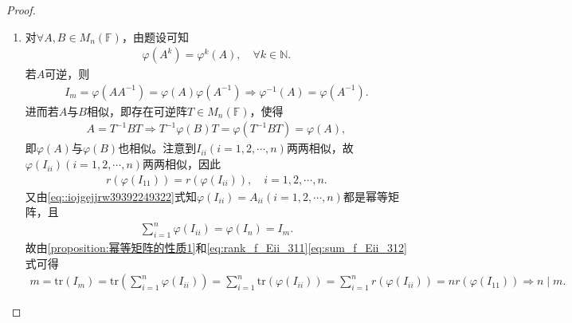 \documentclass[../../main.tex]{subfiles}%
\begin{document}
\begin{proof}
\begin{enumerate}[(1)]
\item 对$\forall A,B\in M_n(\mathbb{F})$，由题设可知
\begin{align*}
\varphi\left(A^k\right)=\varphi^k\left(A\right),\quad \forall k\in \mathbb{N}.
\end{align*}
若$A$可逆，则
\begin{align*}
I_m=\varphi\left(AA^{-1}\right)=\varphi\left(A\right)\varphi\left(A^{-1}\right)\Longrightarrow \varphi^{-1}\left(A\right)=\varphi\left(A^{-1}\right).
\end{align*}
进而若$A$与$B$相似，即存在可逆阵$T\in M_n(\mathbb{F})$，使得
\begin{align*}
A=T^{-1}BT\Longrightarrow T^{-1}\varphi\left(B\right)T=\varphi\left(T^{-1}BT\right)=\varphi\left(A\right),
\end{align*}
即$\varphi\left(A\right)$与$\varphi\left(B\right)$也相似。注意到$I_{ii}\left(i=1,2,\cdots,n\right)$两两相似，故$\varphi\left(I_{ii}\right)\left(i=1,2,\cdots,n\right)$两两相似，因此
\begin{align}
r\left(\varphi\left(I_{11}\right)\right)=r\left(\varphi\left(I_{ii}\right)\right),\quad i=1,2,\cdots,n.
\label{eq:rank_f_Eii_311}
\end{align}
又由\eqref{eq::iojgejjrw39392249322}式知$\varphi\left(I_{ii}\right)=A_{ii}\left(i=1,2,\cdots,n\right)$都是幂等矩阵，且
\begin{align}
\sum\limits_{i=1}^n \varphi\left(I_{ii}\right)=\varphi\left(I_n\right)=I_m.
\label{eq:sum_f_Eii_312}
\end{align}
故由\cref{proposition:幂等矩阵的性质1}和\eqref{eq:rank_f_Eii_311}\eqref{eq:sum_f_Eii_312}式可得
\begin{align*}
m=\mathrm{tr}\left(I_m\right)=\mathrm{tr}\left(\sum\limits_{i=1}^n \varphi\left(I_{ii}\right)\right)=\sum\limits_{i=1}^n \mathrm{tr}\left(\varphi\left(I_{ii}\right)\right)=\sum\limits_{i=1}^n r\left(\varphi\left(I_{ii}\right)\right)=nr\left(\varphi\left(I_{11}\right)\right)\Longrightarrow n\mid m.
\end{align*}
\end{enumerate}
\end{proof}
\end{document}
